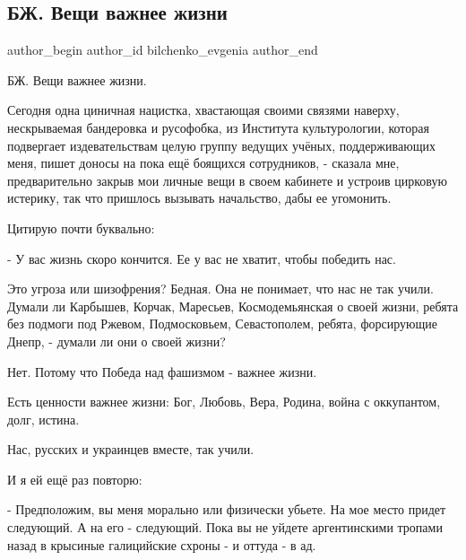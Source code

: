  
 
 
 
 
 
\subsection{БЖ. Вещи важнее жизни}
\label{sec:29_06_2021.fb.bilchenko_evgenia.1.veschi_vazhnee_zhizni}
\ifcmt
 author_begin
   author_id bilchenko_evgenia
 author_end
\fi

БЖ. Вещи важнее жизни.

Сегодня одна циничная нацистка, хвастающая своими связями наверху, нескрываемая
бандеровка и русофобка, из Института культурологии, которая подвергает
издевательствам целую группу ведущих учёных, поддерживающих меня, пишет доносы
на пока ещё боящихся сотрудников, - сказала мне, предварительно закрыв мои
личные вещи в своем кабинете и устроив цирковую истерику, так что пришлось
вызывать начальство, дабы ее угомонить. 

Цитирую почти буквально:

- У вас жизнь скоро кончится. Ее у вас не хватит, чтобы победить нас. 

Это угроза или шизофрения? Бедная. Она не понимает, что нас не так учили.
Думали ли Карбышев, Корчак, Маресьев, Космодемьянская о своей жизни, ребята без
подмоги под Ржевом, Подмосковьем, Севастополем, ребята, форсирующие Днепр, -
думали ли они о своей жизни? 

Нет. Потому что Победа над фашизмом - важнее жизни. 

Есть ценности важнее жизни: Бог, Любовь, Вера, Родина, война с оккупантом, долг, истина. 

Нас, русских и украинцев вместе, так учили. 

И я ей ещё раз повторю:

- Предположим, вы меня морально или физически убьете. На мое место придет
следующий. А на его - следующий. Пока вы не уйдете аргентинскими тропами назад
в крысиные галицийские схроны - и оттуда - в ад.

